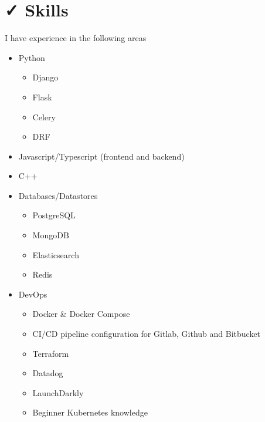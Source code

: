 \documentclass{resume}
\begin{document}
\section{{\faCheck} Skills}
I have experience in the following areas \\
\bigskip
\begin{minipage}[t]{0.3\textwidth}
  \begin{itemize}
    \item Python
    \begin{itemize}
      \item Django
      \item Flask
      \item Celery
      \item DRF
    \end{itemize}
    \item Javascript/Typescript (frontend and backend)
    \item C++
    \item Databases/Datastores
    \begin{itemize}
      \item PostgreSQL
      \item MongoDB
      \item Elasticsearch
      \item Redis
    \end{itemize}
  \end{itemize}
\end{minipage}
\begin{minipage}[t]{0.3\textwidth}
  \begin{itemize}
    \item DevOps
    \begin{itemize}
      \item Docker \& Docker Compose
      \item CI/CD pipeline configuration for Gitlab, Github and Bitbucket
      \item Terraform
      \item Datadog
      \item LaunchDarkly
      \item Beginner Kubernetes knowledge
    \end{itemize}
  \end{itemize}
\end{minipage}
\end{document}
